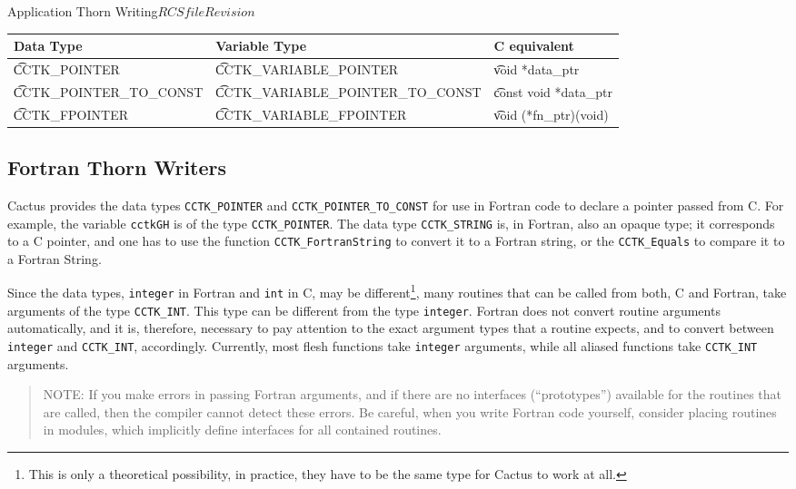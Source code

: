 \begin{cactuspart}{Application Thorn Writing}{$RCSfile$}{$Revision$}
\begin{center}
\begin{tabular}{|l|l|l|}
\hline
   Data Type &
   Variable Type &
   C equivalent
\\\hline
   {\t CCTK\_POINTER} &
   {\t CCTK\_VARIABLE\_POINTER} &
   {\t void *data\_ptr}
\\
   {\t CCTK\_POINTER\_TO\_CONST} &
   {\t CCTK\_VARIABLE\_POINTER\_TO\_CONST} &
   {\t const void *data\_ptr}
\\
   {\t CCTK\_FPOINTER} &
   {\t CCTK\_VARIABLE\_FPOINTER} &
   {\t void (*fn\_ptr)(void)}
\\\hline
\end{tabular}
\end{center}


\subsection{Fortran Thorn Writers}

Cactus provides the data types \texttt{CCTK\_POINTER} and
\texttt{CCTK\_POINTER\_TO\_CONST} for use in Fortran code to declare a
pointer passed from C.  For example, the variable \texttt{cctkGH} is
of the type \texttt{CCTK\_POINTER}.  The data type
\texttt{CCTK\_STRING} is, in Fortran, also an opaque type; it corresponds
to a C pointer, and one has to use the function
\texttt{CCTK\_FortranString} to convert it to a Fortran string, or the
\texttt{CCTK\_Equals} to compare it to a Fortran String.

Since the data types, \texttt{integer} in Fortran and \texttt{int} in C,
may be different\footnote{This is only a theoretical possibility, in practice, they
  have to be the same type for Cactus to work at all.}, 
many routines that can be called from both, C and Fortran, take
arguments of the type \texttt{CCTK\_INT}.  This type can be different
from the type \texttt{integer}.  Fortran does not convert routine
arguments automatically, and it is, therefore, necessary to pay
attention to the exact argument types that a routine expects, and to
convert between \texttt{integer} and \texttt{CCTK\_INT}, accordingly.
Currently, most flesh functions take \texttt{integer} arguments, while
all aliased functions take \texttt{CCTK\_INT} arguments.

\begin{quote}
  NOTE: If you make errors in passing Fortran arguments, and if there
  are no interfaces (``prototypes'') available for the routines that
  are called, then the compiler cannot detect these errors.  Be
  careful, when you write Fortran code yourself, consider placing
  routines in modules, which implicitly define interfaces for all
  contained routines.
\end{quote}


\end{cactuspart}
